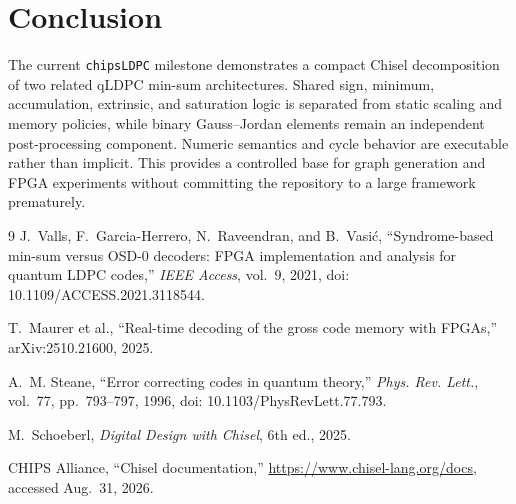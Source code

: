 \documentclass[10pt,conference]{IEEEtran}
\begin{document}
\section{Conclusion}
The current \texttt{chipsLDPC} milestone demonstrates a compact Chisel
decomposition of two related qLDPC min-sum architectures.  Shared sign,
minimum, accumulation, extrinsic, and saturation logic is separated from
static scaling and memory policies, while binary Gauss--Jordan elements remain
an independent post-processing component.  Numeric semantics and cycle
behavior are executable rather than implicit.  This provides a controlled base
for graph generation and FPGA experiments without committing the repository to
a large framework prematurely.

\begin{thebibliography}{9}
J.~Valls, F.~Garcia-Herrero, N.~Raveendran, and B.~Vasi\'{c},
``Syndrome-based min-sum versus OSD-0 decoders: FPGA implementation and
analysis for quantum LDPC codes,'' \emph{IEEE Access}, vol.~9, 2021,
doi: 10.1109/ACCESS.2021.3118544.

T.~Maurer et al., ``Real-time decoding of the gross code memory with FPGAs,''
arXiv:2510.21600, 2025.

A.~M. Steane, ``Error correcting codes in quantum theory,''
\emph{Phys. Rev. Lett.}, vol.~77, pp.~793--797, 1996,
doi: 10.1103/PhysRevLett.77.793.

M.~Schoeberl, \emph{Digital Design with Chisel}, 6th ed., 2025.

CHIPS Alliance, ``Chisel documentation,''
\url{https://www.chisel-lang.org/docs}, accessed Aug.~31, 2026.
\end{thebibliography}
\end{document}
